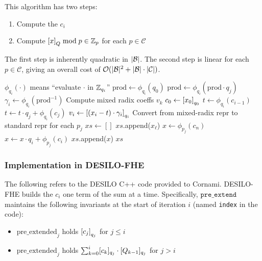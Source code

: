 \documentclass[../../fheimpl.tex]{subfiles}
\begin{document}
This algorithm has two steps:
\begin{enumerate}
	\item Compute the $c_i$
	\item Compute $\bracks*{x}_Q\bmod p\in\Z_p$ for each $p\in \mathcal{C}$
\end{enumerate}
The first step is inherently quadratic in $\abs{\mathcal{B}}$. The second step is linear for each $p\in\mathcal{C}$, giving an overall cost of $\mathcal{O}(\abs{\mathcal{B}}^2+\abs{\mathcal{B}}\cdot \abs{\mathcal{C}})$.

\begin{algorithm}
	\caption{Basis Extension with Garner's Algorithm}\label{alg:basisextgarner}
	\begin{algorithmic}[1]
			\State \Comment $\phi_{q_i}(\cdot)$ means ``evaluate $\cdot$ in $\Z_{q_i}$''
				\State $\textrm{prod} \gets \phi_{q_i}(q_0)$
					\State $\textrm{prod} \gets \phi_{q_i}(\textrm{prod}\cdot q_j)$
				\EndFor
				\State $\gamma_i\gets \phi_{q_i}(\textrm{prod}^{-1})$
			\EndFor
			\State \Comment Compute mixed radix coeffs ${v_k}$
			\State $c_0\gets \bracks*{x_0}_{q_0}$
				\State $t \gets \phi_{q_i}(c_{i-1})$
					\State $t\gets t\cdot q_j+\phi_{q_i}(c_j)$
				\EndFor
				\State $v_i\gets\bracks*{(x_i-t)\cdot \gamma_i}_{q_i}$
			\EndFor
			\State \Comment Convert from mixed-radix repr to standard repr for each $p_j$
			\State $xs\gets []$
					\State $xs$.append($x_\ell$)
				\Else
					\State $x\gets \phi_{p_j}(c_n)$
						\State $x\gets x\cdot q_i + \phi_{p_j}(c_i)$
					\EndFor
					\State $xs$.append($x$)
				\EndIf
			\EndFor
			\Return $xs$
		\EndProcedure
	\end{algorithmic}
\end{algorithm}

\subsubsection{Implementation in DESILO-FHE}
The following refers to the DESILO C++ code provided to Cornami.
DESILO-FHE builds the $c_i$ one term of the sum at a time. Specifically, $\texttt{pre\_extend}$ maintains the following invariants at the start of iteration $i$ (named \texttt{index} in the code):
\begin{itemize}
	\item $\mathrm{pre\_extended}_j$ holds $\bracks*{c_j}_{q_j}$ for $j \le i$
	\item $\mathrm{pre\_extended}_j$ holds $\sum_{k=0}^i \bracks{c_k}_{q_j}\cdot\bracks{Q_{k-1}}_{q_j}$ for $j > i$
\end{itemize}
\end{document}
